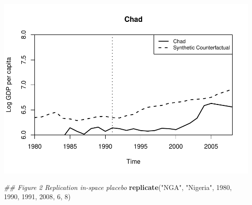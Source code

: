 \documentclass[]{article}
\newenvironment{Shaded}{\begin{snugshade}}{\end{snugshade}}
\newcommand{\CommentTok}[1]{\textcolor[rgb]{0.56,0.35,0.01}{\textit{#1}}}
\newcommand{\DecValTok}[1]{\textcolor[rgb]{0.00,0.00,0.81}{#1}}
\newcommand{\KeywordTok}[1]{\textcolor[rgb]{0.13,0.29,0.53}{\textbf{#1}}}
\newcommand{\NormalTok}[1]{#1}
\newcommand{\StringTok}[1]{\textcolor[rgb]{0.31,0.60,0.02}{#1}}
\begin{document}
\includegraphics{ProjectNotebook_files/figure-latex/unnamed-chunk-7-1.pdf}

\begin{Shaded}
\begin{Highlighting}[]
\CommentTok{## Figure 2 Replication in-space placebo}
\KeywordTok{replicate}\NormalTok{(}\StringTok{"NGA"}\NormalTok{, }\StringTok{"Nigeria"}\NormalTok{, }\DecValTok{1980}\NormalTok{, }\DecValTok{1990}\NormalTok{, }\DecValTok{1991}\NormalTok{, }\DecValTok{2008}\NormalTok{, }\DecValTok{6}\NormalTok{, }\DecValTok{8}\NormalTok{)  }
\end{Highlighting}
\end{Shaded}
\end{document}

